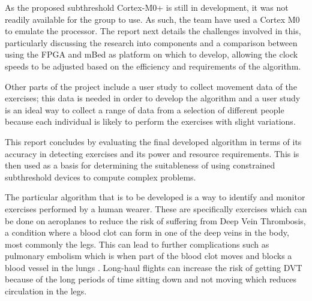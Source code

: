 As the proposed subthreshold Cortex-M0+ is still in development, it was not readily available for the group to use. As such, the team have used a Cortex M0 to emulate the processor. The report next details the challenges involved in this, particularly discussing the research into components and a comparison between using the FPGA and mBed as platform on which to develop, allowing the clock speeds to be adjusted based on the efficiency and requirements of the algorithm.

Other parts of the project include a user study to collect movement data of the exercises; this data is needed in order to develop the algorithm and a user study is an ideal way to collect a range of data from a selection of different people because each individual is likely to perform the exercises with slight variations.

This report concludes by evaluating the final developed algorithm in terms of its accuracy in detecting exercises and its power and resource requirements. This is then used as a basis for determining the suitableness of using constrained subthreshold devices to compute complex problems.


The particular algorithm that is to be developed is a way to identify and monitor exercises performed by a human wearer. These are specifically exercises which can be done on aeroplanes to reduce the risk of suffering from Deep Vein Thrombosis, a condition where a blood clot can form in one of the deep veins in the body, most commonly the legs. This can lead to further complications such as pulmonary embolism which is when part of the blood clot moves and blocks a blood vessel in the lungs \cite{NHS2014DVT}. Long-haul flights can increase the risk of getting DVT because of the long periods of time sitting down and not moving which reduces circulation in the legs.

